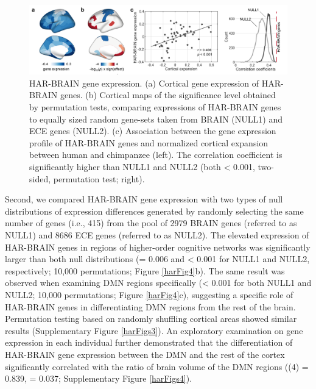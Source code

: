 \begin{refsection}
\begin{figure}[h]
    \centering
    \includegraphics[width=\linewidth]{images/harFig3.png}
    \caption{HAR-BRAIN gene expression. (a) Cortical gene expression of HAR-BRAIN genes. (b) Cortical maps of the significance level obtained by permutation tests, comparing expressions of HAR-BRAIN genes to equally sized random gene-sets taken from BRAIN (NULL1) and ECE genes (NULL2). (c) Association between the gene expression profile of HAR-BRAIN genes and normalized cortical expansion between human and chimpanzee (left). The correlation coefficient is significantly higher than NULL1 and NULL2 (both \pval < 0.001, two-sided, permutation test; right).}
    \label{harFig3}
\end{figure}

Second, we compared HAR-BRAIN gene expression with two types of null distributions of expression differences generated by randomly selecting the same number of genes (i.e., 415) from the pool of 2979 BRAIN genes (referred to as NULL1) and 8686 ECE genes (referred to as NULL2). The elevated expression of HAR-BRAIN genes in regions of higher-order cognitive networks was significantly larger than both null distributions (\pval = 0.006 and \pval < 0.001 for NULL1 and NULL2, respectively; 10,000 permutations; Figure \ref{harFig4}b). The same result was observed when examining DMN regions specifically (\pval < 0.001 for both NULL1 and NULL2; 10,000 permutations; Figure \ref{harFig4}c), suggesting a specific role of HAR-BRAIN genes in differentiating DMN regions from the rest of the brain. Permutation testing based on randomly shuffling cortical areas showed similar results (Supplementary Figure \ref{harFigs3}). An exploratory examination on gene expression in each individual further demonstrated that the differentiation of HAR-BRAIN gene expression between the DMN and the rest of the cortex significantly correlated with the ratio of brain volume of the DMN regions (\rvaldf(4) = 0.839, \pval = 0.037; Supplementary Figure \ref{harFigs4}).


\end{refsection}

